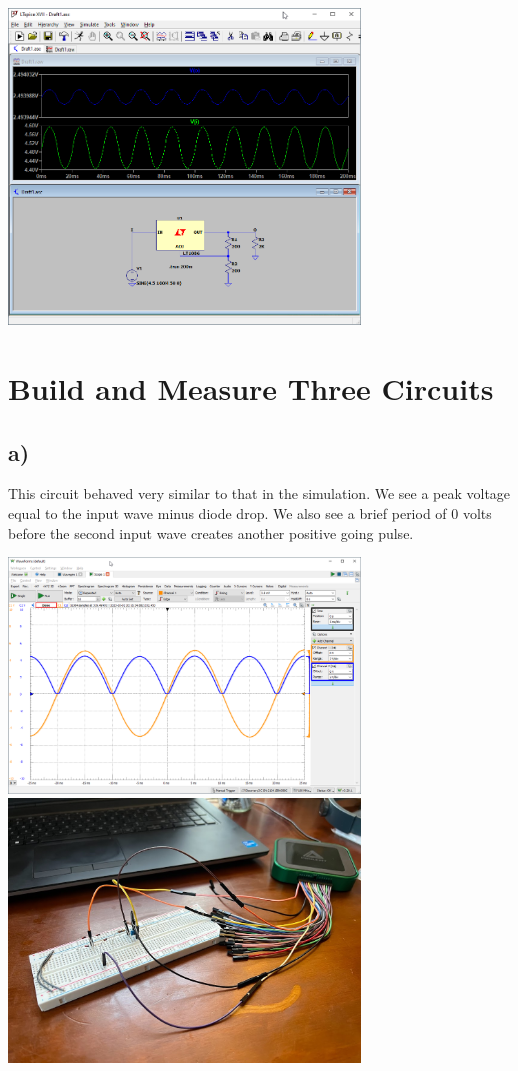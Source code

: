 \documentclass{article}
\begin{document}
	
	

	
	\begin{center}
	\includegraphics[width=0.7\textwidth]{fig1c}
	\end{center}

	\section{Build and Measure Three Circuits}	
	
	\subsection*{a)}
	
	This circuit behaved very similar to that in the simulation. We see a peak voltage equal to the input wave minus diode drop. We also see a brief period of 0 volts before the second input wave creates another positive going pulse.
	
	\begin{center}
	\includegraphics[width=0.7\textwidth]{fig2a-scope-2}
	\includegraphics[width=0.7\textwidth]{rectifier}
	\end{center}
	
\end{document}
